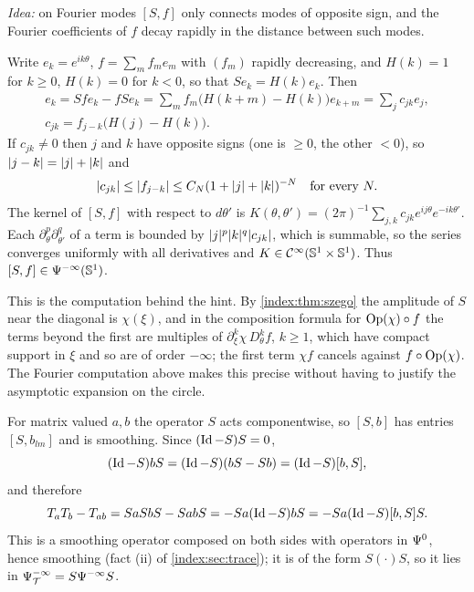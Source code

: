 \subsection*{}
\emph{Idea:} on Fourier modes $[S,f]$ only connects modes of opposite sign, and the
Fourier coefficients of $f$ decay rapidly in the distance between such modes.

Write $e_k=e^{ik\theta}$, $f=\sum_mf_me_m$ with $(f_m)$ rapidly decreasing, and
$H(k)=1$ for $k\ge0$, $H(k)=0$ for $k<0$, so that $Se_k=H(k)e_k$. Then
\begin{gather*}
  [S,f]e_k=Sfe_k-fSe_k=\sum_mf_m\bigl(H(k+m)-H(k)\bigr)e_{k+m}
  =\sum_jc_{jk}e_j,\\ c_{jk}=f_{j-k}\bigl(H(j)-H(k)\bigr).
\end{gather*}
If $c_{jk}\ne0$ then $j$ and $k$ have opposite signs (one is $\ge0$, the other
$<0$), so $\lvert j-k\rvert=\lvert j\rvert+\lvert k\rvert$ and
\begin{equation*}
  \lvert c_{jk}\rvert\le\lvert f_{j-k}\rvert\le C_N(1+\lvert j\rvert+\lvert k\rvert)^{-N}\quad\text{for every }N .
\end{equation*}
The kernel of $[S,f]$ with respect to $d\theta'$ is
$K(\theta,\theta')=(2\pi)^{-1}\sum_{j,k}c_{jk}e^{ij\theta}e^{-ik\theta'}$. Each
$\partial_\theta^p\partial_{\theta'}^q$ of a term is bounded by
$\lvert j\rvert^p\lvert k\rvert^q\lvert c_{jk}\rvert$, which is summable, so the series converges uniformly
with all derivatives and $K\in\mathcal{C}^\infty(\mathbb{S}^1\times\mathbb{S}^1)$. Thus
$[S,f]\in\Psi^{-\infty}(\mathbb{S}^1)$.

This is the computation behind the hint. By \cref{index:thm:szego} the amplitude of $S$
near the diagonal is $\chi(\xi)$, and in the composition formula for
$\operatorname{Op}(\chi)\circ f$ the terms beyond the first are multiples of
$\partial_\xi^k\chi\,D_\theta^kf$, $k\ge1$, which have compact support in $\xi$ and
so are of order $-\infty$; the first term $\chi f$ cancels against $f\circ\operatorname{Op}(\chi)$.
The Fourier computation above makes this precise without having to justify the
asymptotic expansion on the circle.

For matrix valued $a,b$ the operator $S$ acts componentwise, so $[S,b]$ has entries
$[S,b_{lm}]$ and is smoothing. Since $(\operatorname{Id}-S)S=0$,
\begin{equation*}
  (\operatorname{Id}-S)bS=(\operatorname{Id}-S)(bS-Sb)=(\operatorname{Id}-S)[b,S],
\end{equation*}
and therefore
\begin{equation*}
  T_aT_b-T_{ab}=SaSbS-SabS=-Sa(\operatorname{Id}-S)bS=-Sa(\operatorname{Id}-S)[b,S]S .
\end{equation*}
This is a smoothing operator composed on both sides with operators in $\Psi^{0}$, hence
smoothing (fact (ii) of \cref{index:sec:trace}); it is of the form $S(\cdot)S$, so it
lies in $\Psi^{-\infty}_{\mathcal T}=S\Psi^{-\infty}S$.

